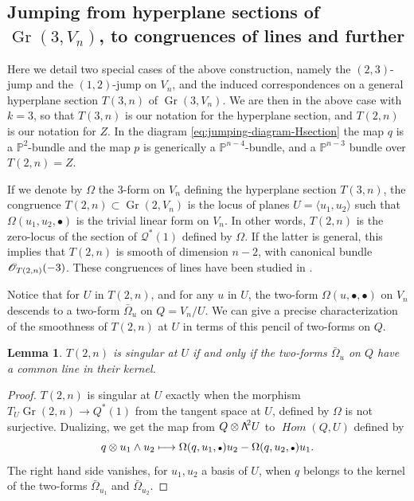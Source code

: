 \documentclass[11pt]{article}
\newcommand{\sbullet}{{\scriptstyle\bullet}}
\newcommand\bw[1]{{\hbox{\large$\mathsf{\Lambda}$}^{\!#1}}}
\newcommand\mto{\mathchoice{\longmapsto}{\mapsto}{\mapsto}{\mapsto}}
\DeclareMathOperator{\iHom}{\mathit{Hom}}
\let\mathcal\mathscr
\theoremstyle{plain}
\newtheorem{lemma}[theorem]{Lemma}
\theoremstyle{definition}
\DeclareMathOperator{\Gr}{Gr}
\newcommand{\PP}{\mathbb{P}}
\newcommand{\sheaf}[1]{\mathcal{#1}}
\newcommand{\kq}{\sheaf{Q}}
\begin{document}
\subsection{Jumping from hyperplane sections of $\Gr(3,V_n)$, to congruences of lines and further}

Here we detail two special cases of the above construction, namely the $(2,3)$-jump and the $(1,2)$-jump on $V_n$, and the induced correspondences on a general hyperplane section $T(3,n)$ of $\Gr(3,V_n)$. We are then in the above case with $k=3$, so that $T(3,n)$ is our notation for the hyperplane section, and $T(2,n)$ is our notation for $Z$. In the diagram \eqref{eq:jumping-diagram-Hsection} the map $q$ is a $\PP^2$-bundle and the map $p$ is generically a $\PP^{n-4}$-bundle, and a $\PP^{n-3}$ bundle over $T(2,n)=Z$.

If we denote by $\Omega$ the $3$-form on $V_n$ defining the hyperplane section $T(3,n)$, the congruence $T(2,n) \subset \Gr(2,V_n)$ is the locus of planes $U=\langle
u_1, u_2\rangle$ such that $\Omega(u_1,u_2,\sbullet)$ is the trivial linear form on $V_n$. In other
words, $T(2,n)$ is the zero-locus of the section of $\kq^*(1)$ defined by $\Omega$. If the latter
is general, this implies that $T(2,n)$ is smooth of dimension $n-2$, with canonical bundle
$\cO_{T(2,n)}(-3)$. These congruences of lines have been studied in \cite{dpfmr}.

Notice that for $U$ in $T(2,n)$, and for any $u$ in $U$, the two-form $\Omega(u,\sbullet,\sbullet)$ on $V_n$
descends to a two-form $\bar\Omega_u$ on $Q=V_n/U$. We can give a precise characterization of the smoothness of $T(2,n)$ at $U$ in terms of this pencil of two-forms on $Q$.

\begin{lemma}
$T(2,n)$ is singular at $U$ if and only if the two-forms $\bar\Omega_u$ on $Q$ have
a common line in their kernel.
\end{lemma}

\begin{proof}
$T(2,n)$ is singular at $U$ exactly when the morphism $T_U\Gr(2,n)\to Q^*(1)$ from the tangent space at $U$, defined
by $\Omega$ is not surjective. Dualizing, we get the map from $Q\otimes\bw2U$
to $\iHom(Q,U)$ defined by\vspace*{-3pt}\enlargethispage{\baselineskip}%
\[
q\otimes u_1\wedge u_2 \mto \Omega(q,u_1,\sbullet)u_2-\Omega(q,u_2,\sbullet)u_1.
\]
The right hand side vanishes, for $u_1, u_2$ a basis of $U$, when $q$ belongs to the
kernel of the two-forms $\bar\Omega_{u_1}$ and $\bar\Omega_{u_2}$.\end{proof}
\end{document}
